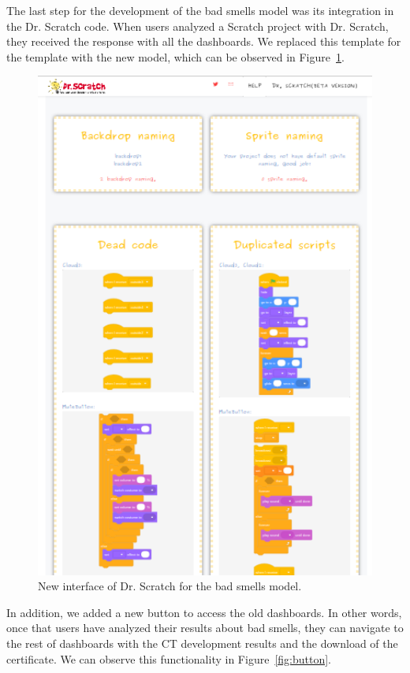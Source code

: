 The last step for the development of the bad smells model was its integration in the Dr. Scratch code. When users analyzed a Scratch project with Dr. Scratch, they received the response with all the dashboards. We replaced this template for the template with the new model, which can be observed in Figure~\ref{fig:newmodel}.

\begin{figure}
    \centering
    \includegraphics[width=12cm,                         keepaspectratio]{img/newmodel.png}
    \caption{New interface of Dr. Scratch for the bad smells model.}
    \label{fig:newmodel}
\end{figure}

In addition, we added a new button to access the old dashboards. In other words, once that users have analyzed their results about bad smells, they can navigate to the rest of dashboards with the CT development results and the download of the certificate. We can observe this functionality in Figure~\ref{fig:button}.

